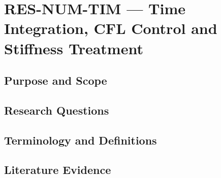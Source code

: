 
\section{RES-NUM-TIM --- Time Integration, CFL Control and Stiffness Treatment}
\label{sec:res-num-tim}

\subsection{Purpose and Scope}
\label{sec:res-num-tim-purpose}


\subsection{Research Questions}
\label{sec:res-num-tim-research-questions}


\subsection{Terminology and Definitions}
\label{sec:res-num-tim-definitions}


\subsection{Literature Evidence}
\label{sec:res-num-tim-literature-evidence}

%

